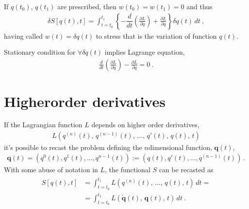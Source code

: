 \documentclass[letterpaper,10pt,english]{jupyterBook}
\begin{document}
\sphinxAtStartPar
If \(q(t_0)\), \(q(t_1)\) are prescribed, then \(w(t_0) = w(t_1) = 0\) and thus
\begin{equation*}
\begin{split}\delta S[q(t), t] = \int_{t = t_0}^{t_1} \left\{ - \dfrac{d}{dt} \left( \frac{\partial L}{\partial \dot{q}} \right) + \frac{\partial L}{\partial q} \right\} \delta q(t) \, dt \ ,\end{split}
\end{equation*}
\sphinxAtStartPar
having called \(w(t) = \delta q(t)\) to stress that is the variation of function \(q(t)\).

\sphinxAtStartPar
{} Stationary condition for \(\forall \delta q(t)\) implies Lagrange equation,
\begin{equation*}
\begin{split}\frac{d}{dt}\left( \frac{\partial L}{\partial \dot{q}} \right) - \frac{\partial L}{\partial q} = 0 \ .\end{split}
\end{equation*}

\section{Higher\sphinxhyphen{}order derivatives}
\label{\detokenize{ch/calculus-variations/intro:higher-order-derivatives}}
\sphinxAtStartPar
{} If the Lagrangian function \(L\) depends on higher order derivatives,
\begin{equation*}
\begin{split}L \left(q^{(n)}(t), \, q^{(n-1)}(t), \, \dots, \, q'(t), \, q(t), \, t \right)\end{split}
\end{equation*}
\sphinxAtStartPar
it’s possible to recast the problem defining the \(n\)\sphinxhyphen{}dimensional function, \(\mathbf{q}(t)\),
\begin{equation*}
\begin{split}\mathbf{q}(t) = \left( q^0(t), q^1(t), \dots, q^{n-1}(t) \right) := \left(q(t), q'(t), \dots, q^{(n-1)}(t) \right) \ .\end{split}
\end{equation*}
\sphinxAtStartPar
With some abuse of notation in \(L\), the functional \(S\) can be recasted as
\begin{equation*}
\begin{split}\begin{aligned}
  S[q(t),t] 
  & = \int_{t=t_0}^{t_1} L(q^{(n)}(t), \, \dots, \, q(t), \, t) \, dt = \\
  & = \int_{t=t_0}^{t_1} L(\dot{\mathbf{q}}(t), \, \mathbf{q}(t), \, t) \, dt \ .
\end{aligned}\end{split}
\end{equation*}
\sphinxAtStartPar
{} 
\end{document}
